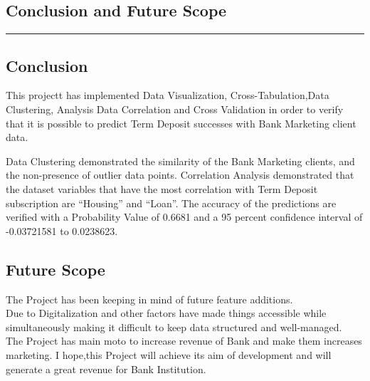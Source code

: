 \begin{itemize}
\chapter{Conclusion and Future Scope}\hrule
\label{Chapter:5}
\section{Conclusion}
This projectt has implemented Data Visualization, Cross-Tabulation,Data Clustering,  Analysis Data Correlation and Cross Validation in order to verify that it is possible to predict Term Deposit successes with Bank Marketing client data.

Data Clustering demonstrated the similarity of the Bank Marketing clients, and the non-presence of outlier data points. Correlation Analysis demonstrated that the dataset variables that have the most correlation with Term Deposit subscription are “Housing” and “Loan”. The accuracy of the predictions are verified with a Probability Value of 0.6681 and a 95 percent confidence interval of -0.03721581 to 0.0238623.
\section{Future Scope}
The Project has been keeping in mind of future feature additions.\\
Due to Digitalization and other factors have made things accessible while simultaneously making it difficult to keep data structured and well-managed.\\
The Project has main moto to increase revenue of Bank and make them increases marketing. I hope,this Project will achieve its aim of development and will generate a great revenue for Bank Institution.

\end{itemize}

